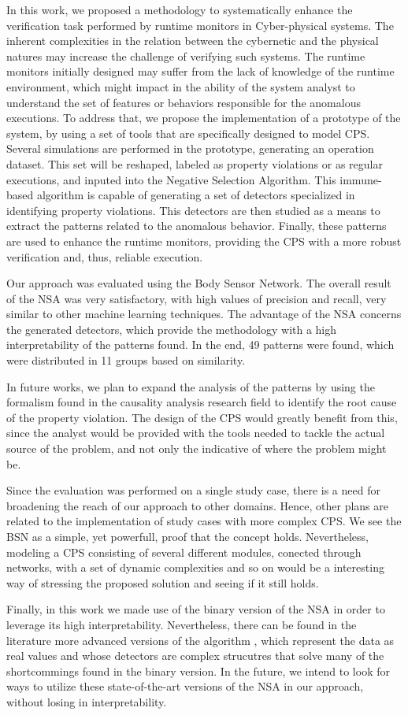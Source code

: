 \label{sec:Conclusion}
In this work, we proposed a methodology to systematically enhance the verification task performed by runtime monitors in Cyber-physical systems. The inherent complexities in the relation between the cybernetic and the physical natures may increase the challenge of verifying such systems. The runtime monitors initially designed may suffer from the lack of knowledge of the runtime environment, which might impact in the ability of the system analyst to understand the set of features or behaviors responsible for the anomalous executions. To address that, we propose the implementation of a prototype of the system, by using a set of tools that are specifically designed to model CPS. Several simulations are performed in the prototype, generating an operation dataset. This set will be reshaped, labeled as property violations or as regular executions, and inputed into the Negative Selection Algorithm. This immune-based algorithm is capable of generating a set of detectors specialized in identifying property violations. This detectors are then studied as a means to extract the patterns related to the anomalous behavior. Finally, these patterns are used to enhance the runtime monitors, providing the CPS with a more robust verification and, thus, reliable execution.

Our approach was evaluated using the Body Sensor Network. The overall result of the NSA was very satisfactory, with high values of precision and recall, very similar to other machine learning techniques. The advantage of the NSA concerns the generated detectors, which provide the methodology with a high interpretability of the patterns found. In the end, 49 patterns were found, which were distributed in 11 groups based on similarity.

In future works, we plan to expand the analysis of the patterns by using the formalism found in the causality analysis research field to identify the root cause of the property violation. The design of the CPS would greatly benefit from this, since the analyst would be provided with the tools needed to tackle the actual source of the problem, and not only the indicative of where the problem might be. 

Since the evaluation was performed on a single study case, there is a need for broadening the reach of our approach to other domains. Hence, other plans are related to the implementation of study cases with more complex CPS. We see the BSN as a simple, yet powerfull, proof that the concept holds. Nevertheless, modeling a CPS consisting of several different modules, conected through networks, with a set of dynamic complexities and so on would be a interesting way of stressing the proposed solution and seeing if it still holds.

Finally, in this work we made use of the binary version of the NSA in order to leverage its high interpretability. Nevertheless, there can be found in the literature more advanced versions of the algorithm \cite{NSAResearch2021}, which represent the data as real values and whose detectors are complex strucutres that solve many of the shortcommings found in the binary version. In the future, we intend to look for ways to utilize these state-of-the-art versions of the NSA in our approach, without losing in interpretability.  